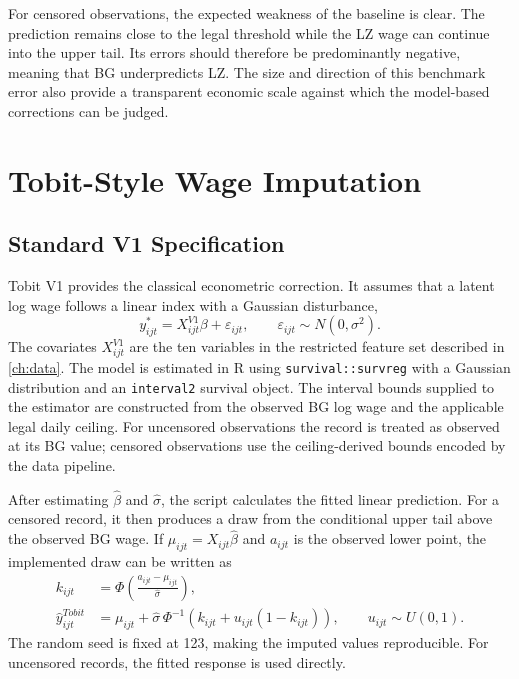 \documentclass[12pt,a4paper,oneside,titlepage]{book}
\begin{document}
For censored observations, the expected weakness of the baseline is clear. The prediction remains close to the legal threshold while the LZ wage can continue into the upper tail. Its errors should therefore be predominantly negative, meaning that BG underpredicts LZ. The size and direction of this benchmark error also provide a transparent economic scale against which the model-based corrections can be judged.

\section{Tobit-Style Wage Imputation}
\label{sec:tobit}

\subsection{Standard V1 Specification}
Tobit V1 provides the classical econometric correction. It assumes that a latent log wage follows a linear index with a Gaussian disturbance,
\begin{equation}
  y^{*}_{ijt}=X^{V1}_{ijt}\beta+\varepsilon_{ijt},
  \qquad \varepsilon_{ijt}\sim N(0,\sigma^2).
  \label{eq:tobit}
\end{equation}
The covariates $X^{V1}_{ijt}$ are the ten variables in the restricted feature set described in \cref{ch:data}. The model is estimated in R using \texttt{survival::survreg} with a Gaussian distribution and an \texttt{interval2} survival object. The interval bounds supplied to the estimator are constructed from the observed BG log wage and the applicable legal daily ceiling. For uncensored observations the record is treated as observed at its BG value; censored observations use the ceiling-derived bounds encoded by the data pipeline.

After estimating $\widehat\beta$ and $\widehat\sigma$, the script calculates the fitted linear prediction. For a censored record, it then produces a draw from the conditional upper tail above the observed BG wage. If $\mu_{ijt}=X_{ijt}\widehat\beta$ and $a_{ijt}$ is the observed lower point, the implemented draw can be written as
\begin{align}
  k_{ijt} &= \Phi\!\left(\frac{a_{ijt}-\mu_{ijt}}{\widehat\sigma}\right),\\
  \widehat y^{Tobit}_{ijt}
  &=\mu_{ijt}+\widehat\sigma\,
    \Phi^{-1}\!\left(k_{ijt}+u_{ijt}(1-k_{ijt})\right),
  \qquad u_{ijt}\sim U(0,1).
\end{align}
The random seed is fixed at 123, making the imputed values reproducible. For uncensored records, the fitted response is used directly.
\end{document}
